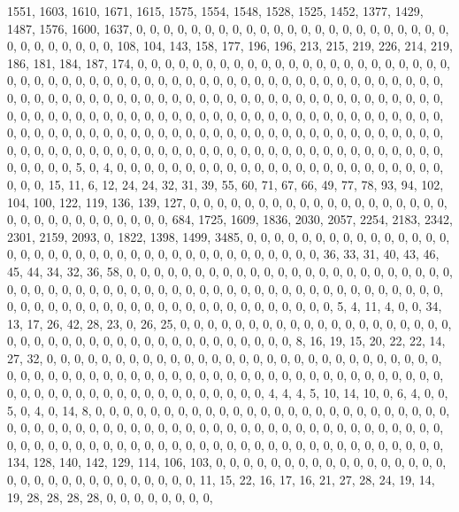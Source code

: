 \documentclass[
]{article}
\begin{document}
1551, 1603, 1610, 1671, 1615, 1575, 1554, 1548, 1528, 1525, 1452, 1377,
1429, 1487, 1576, 1600, 1637, 0, 0, 0, 0, 0, 0, 0, 0, 0, 0, 0, 0, 0, 0,
0, 0, 0, 0, 0, 0, 0, 0, 0, 0, 0, 0, 0, 0, 0, 0, 0, 108, 104, 143, 158,
177, 196, 196, 213, 215, 219, 226, 214, 219, 186, 181, 184, 187, 174, 0,
0, 0, 0, 0, 0, 0, 0, 0, 0, 0, 0, 0, 0, 0, 0, 0, 0, 0, 0, 0, 0, 0, 0, 0,
0, 0, 0, 0, 0, 0, 0, 0, 0, 0, 0, 0, 0, 0, 0, 0, 0, 0, 0, 0, 0, 0, 0, 0,
0, 0, 0, 0, 0, 0, 0, 0, 0, 0, 0, 0, 0, 0, 0, 0, 0, 0, 0, 0, 0, 0, 0, 0,
0, 0, 0, 0, 0, 0, 0, 0, 0, 0, 0, 0, 0, 0, 0, 0, 0, 0, 0, 0, 0, 0, 0, 0,
0, 0, 0, 0, 0, 0, 0, 0, 0, 0, 0, 0, 0, 0, 0, 0, 0, 0, 0, 0, 0, 0, 0, 0,
0, 0, 0, 0, 0, 0, 0, 0, 0, 0, 0, 0, 0, 0, 0, 0, 0, 0, 0, 0, 0, 0, 0, 0,
0, 0, 0, 0, 0, 0, 0, 0, 0, 0, 0, 0, 0, 0, 0, 0, 0, 0, 0, 0, 0, 0, 0, 0,
0, 0, 0, 0, 0, 0, 0, 0, 0, 0, 0, 0, 0, 0, 0, 0, 0, 0, 0, 5, 0, 4, 0, 0,
0, 0, 0, 0, 0, 0, 0, 0, 0, 0, 0, 0, 0, 0, 0, 0, 0, 0, 0, 0, 0, 0, 0, 0,
0, 15, 11, 6, 12, 24, 24, 32, 31, 39, 55, 60, 71, 67, 66, 49, 77, 78,
93, 94, 102, 104, 100, 122, 119, 136, 139, 127, 0, 0, 0, 0, 0, 0, 0, 0,
0, 0, 0, 0, 0, 0, 0, 0, 0, 0, 0, 0, 0, 0, 0, 0, 0, 0, 0, 0, 0, 0, 0,
684, 1725, 1609, 1836, 2030, 2057, 2254, 2183, 2342, 2301, 2159, 2093,
0, 1822, 1398, 1499, 3485, 0, 0, 0, 0, 0, 0, 0, 0, 0, 0, 0, 0, 0, 0, 0,
0, 0, 0, 0, 0, 0, 0, 0, 0, 0, 0, 0, 0, 0, 0, 0, 0, 0, 0, 0, 0, 0, 0, 36,
33, 31, 40, 43, 46, 45, 44, 34, 32, 36, 58, 0, 0, 0, 0, 0, 0, 0, 0, 0,
0, 0, 0, 0, 0, 0, 0, 0, 0, 0, 0, 0, 0, 0, 0, 0, 0, 0, 0, 0, 0, 0, 0, 0,
0, 0, 0, 0, 0, 0, 0, 0, 0, 0, 0, 0, 0, 0, 0, 0, 0, 0, 0, 0, 0, 0, 0, 0,
0, 0, 0, 0, 0, 0, 0, 0, 0, 0, 0, 0, 0, 0, 0, 0, 0, 0, 0, 0, 0, 0, 0, 5,
4, 11, 4, 0, 0, 34, 13, 17, 26, 42, 28, 23, 0, 26, 25, 0, 0, 0, 0, 0, 0,
0, 0, 0, 0, 0, 0, 0, 0, 0, 0, 0, 0, 0, 0, 0, 0, 0, 0, 0, 0, 0, 0, 0, 0,
0, 0, 0, 0, 0, 0, 0, 0, 0, 0, 0, 8, 16, 19, 15, 20, 22, 22, 14, 27, 32,
0, 0, 0, 0, 0, 0, 0, 0, 0, 0, 0, 0, 0, 0, 0, 0, 0, 0, 0, 0, 0, 0, 0, 0,
0, 0, 0, 0, 0, 0, 0, 0, 0, 0, 0, 0, 0, 0, 0, 0, 0, 0, 0, 0, 0, 0, 0, 0,
0, 0, 0, 0, 0, 0, 0, 0, 0, 0, 0, 0, 0, 0, 0, 0, 0, 0, 0, 0, 0, 0, 0, 0,
0, 0, 0, 0, 0, 0, 0, 0, 4, 4, 4, 5, 10, 14, 10, 0, 6, 4, 0, 0, 5, 0, 4,
0, 14, 8, 0, 0, 0, 0, 0, 0, 0, 0, 0, 0, 0, 0, 0, 0, 0, 0, 0, 0, 0, 0, 0,
0, 0, 0, 0, 0, 0, 0, 0, 0, 0, 0, 0, 0, 0, 0, 0, 0, 0, 0, 0, 0, 0, 0, 0,
0, 0, 0, 0, 0, 0, 0, 0, 0, 0, 0, 0, 0, 0, 0, 0, 0, 0, 0, 0, 0, 0, 0, 0,
0, 0, 0, 0, 0, 0, 0, 0, 0, 0, 0, 0, 0, 0, 0, 0, 0, 0, 0, 0, 0, 134, 128,
140, 142, 129, 114, 106, 103, 0, 0, 0, 0, 0, 0, 0, 0, 0, 0, 0, 0, 0, 0,
0, 0, 0, 0, 0, 0, 0, 0, 0, 0, 0, 0, 0, 0, 0, 0, 0, 11, 15, 22, 16, 17,
16, 21, 27, 28, 24, 19, 14, 19, 28, 28, 28, 28, 0, 0, 0, 0, 0, 0, 0, 0,
\end{document}
